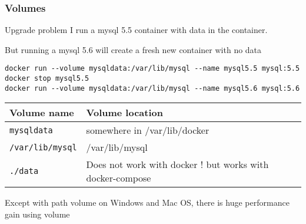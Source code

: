 \documentclass{beamer}
\begin{document}
\begin{frame}[fragile]
    \frametitle{Volumes}
    \begin{block}{Upgrade problem}
    I run a mysql 5.5 container with data in the container.

    But running a mysql 5.6 will create a fresh new container with no data
    \end{block}
    \begin{verbatim}
docker run --volume mysqldata:/var/lib/mysql --name mysql5.5 mysql:5.5
docker stop mysql5.5
docker run --volume mysqldata:/var/lib/mysql --name mysql5.6 mysql:5.6
    \end{verbatim}

    {\scriptsize
    \begin{table}
    \begin{tabular}{|l|p{5cm}|} \hline \rowcolor{lightgray}
Volume name                          & Volume location              \\ \hline
\texttt{mysqldata}      & somewhere in /var/lib/docker \\ \hline
\texttt{/var/lib/mysql} & /var/lib/mysql               \\ \hline
\texttt{./data}         & Does not work with docker ! \newline
                                       but works with docker-compose \\ \hline
    \end{tabular}
    \end{table}
    }
Except with path volume on Windows and Mac OS, there is huge performance gain using volume
\end{frame}
\end{document}
